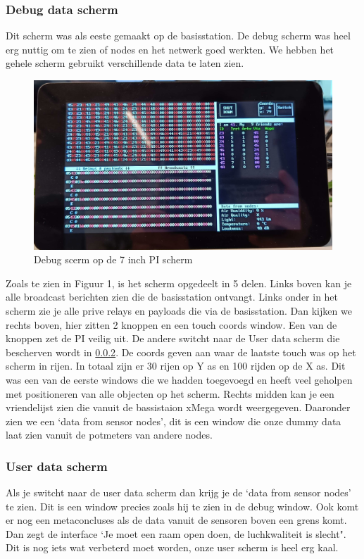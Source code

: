 \subsubsection{Debug data scherm}
Dit scherm was als eeste gemaakt op de basisstation. De debug scherm was heel erg nuttig om te zien of nodes en het netwerk goed werkten. 
We hebben het gehele scherm gebruikt verschillende data te laten zien. 
\begin{figure}[h]
    \centering
    \includegraphics*[scale=0.17]{img/debugScherm.jpg}
    \caption{Debug scerm op de 7 inch PI scherm}
\end{figure}
Zoals te zien in Figuur 1, is het scherm opgedeelt in 5 delen. Links boven kan je alle broadcast berichten zien die de basisstation ontvangt. 
Links onder in het scherm zie je alle prive relays en payloads die via de basisstation. Dan kijken we rechts boven, hier zitten 2 knoppen en een touch coords window. Een van de knoppen zet de PI veilig uit. De andere switcht naar de User data scherm die bescherven wordt in \ref{userParagraph}.
De coords geven aan waar de laatste touch was op het scherm in rijen. In totaal zijn er 30 rijen op Y as en 100 rijden op de X as. Dit was een van de eerste windows die we hadden toegevoegd en heeft veel geholpen met positioneren van alle objecten op het scherm.
Rechts midden kan je een vriendelijst zien die vanuit de bassistaion xMega wordt weergegeven. Daaronder zien we een `data from sensor nodes', dit is een window die onze dummy data laat zien vanuit de potmeters van andere nodes. 
\subsubsection{User data scherm}\label{userParagraph}
Als je switcht naar de user data scherm dan krijg je de `data from sensor nodes' te zien. Dit is een window precies zoals hij te zien in de debug window.
Ook komt er nog een metaconcluses als de data vanuit de sensoren boven een grens komt. Dan zegt de interface `Je moet een raam open doen, de luchkwaliteit is slecht". Dit is nog iets wat verbeterd moet worden, onze user scherm is heel erg kaal. 
